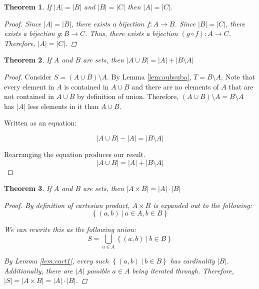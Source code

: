 \documentclass{article}
\newcommand{\divides}{\ |\ }
\newtheorem{theorem}{Theorem}
\begin{document}
\begin{outline}[enumerate]
    \1 \begin{theorem}
        If $|A| = |B|$ and $|B| = |C|$ then $|A| = |C|$. 
    \begin{proof}
        Since $|A| = |B|$, there exists a bijection $f: A \rightarrow B$. Since $|B| = |C|$, there exists a bijection $g: B \rightarrow C$. Thus, there exists a bijection $(g \circ f): A \rightarrow C$. Therefore, $|A| = |C|$.
    \end{proof}
    \end{theorem}

    \1 \begin{theorem}
        If $A$ and $B$ are sets, then $|A \cup B| = |A| + |B \setminus A|$
    \end{theorem}

    \begin{proof}
        Consider $S = (A \cup B) \setminus A$. By Lemma \ref{lem:aubsuba}, $T = B \setminus A$. Note that every element in $A$ is contained in $A \cup B$ and there are no elements of $A$ that are not contained in $A \cup B$ by definition of union. Therefore, $(A \cup B) \setminus A = B \setminus A$ has $|A|$ less elements in it than $A \cup B$. 

        Written as an equation:

        $$|A \cup B| - |A| = |B \setminus A|$$

        Rearranging the equation produces our result. 
        $$|A \cup B| = |A| + |B \setminus A|$$
    \end{proof}

    \1 \begin{theorem}
        If $A$ and $B$ are sets, then $|A \times B| = |A| \cdot |B|$
    \begin{proof}
        By definition of cartesian product, $A \times B$ is expanded out to the following:
        $$\left\{(a, b) \divides a \in A, b \in B\right\}$$

        We can rewrite this as the following union:
        $$S = \bigcup_{a \in A} \left\{(a, b) \divides b \in B\right\}$$

        By Lemma \ref{lem:cart1}, every such $\left\{(a, b) \divides b \in B\right\}$ has cardinality $|B|$. Additionally, there are $|A|$ possible $a \in A$ being iterated through. Therefore, $|S| = |A \times B| = |A|\cdot|B|$.
    \end{proof}
    \end{theorem}

\end{outline} 
\end{document}
